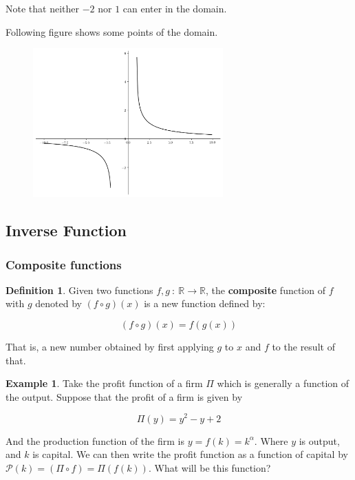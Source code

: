 \documentclass[a4paper,11pt]{article}
\theoremstyle{definition}
\newtheorem{definition}{Definition}
\newtheorem{example}{Example}
\theoremstyle{plain}
\begin{document}
Note that neither \(-2\) nor \(1\) can enter in the domain.

Following figure shows some points of the domain.

    \begin{figure}[htbp]
    	\centering 
    		\includegraphics[width = 0.65\textwidth]{Ch1_files/Ch1_16_0.png}
    \end{figure}
    

\subsection{Inverse Function}\label{inverse-function}

\subsubsection{Composite functions}\label{composite-functions}

\begin{definition} 
Given two functions $f,g \ : \ \mathbb{R} \rightarrow \mathbb{R}$, the \textbf{composite} function of $f$ with $g$ denoted by $(f\circ g)(x)$ is a new function
defined by:

\[
(f\circ g)(x) = f(g(x))
\]

That is, a new number obtained by first applying $g$ to $x$ and $f$ to the result of that.
\end{definition}

\begin{example} 
Take the profit function of a firm \(\Pi\) which is
generally a function of the output. Suppose that the profit of a firm is
given by

\[
\Pi(y) = y^2 - y + 2
\]

And the production function of the firm is $y = f(k) = k^{\alpha}$. Where $y$ is output, and $k$ is capital. We can then write the profit function as a function of capital by $\mathcal{P}(k) = \left(\Pi\circ f\right) = \Pi(f(k))$. What will be this function?
\end{example}
\end{document}
